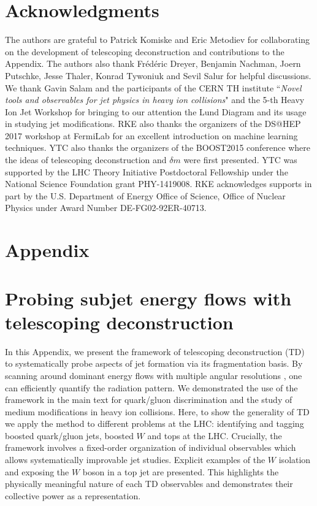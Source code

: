 \documentclass[notoc,preprintnumbers]{JHEP3}
\begin{document}
\section*{Acknowledgments}
The authors are grateful to Patrick Komiske and Eric Metodiev for collaborating on the development of telescoping deconstruction and contributions to the Appendix. The authors also thank Fr\'ed\'eric Dreyer, Benjamin Nachman, Joern Putschke, Jesse Thaler, Konrad Tywoniuk and Sevil Salur for helpful discussions. We thank Gavin Salam and the participants of the CERN TH institute ``{\sl Novel tools and observables for jet physics in heavy ion collisions}" and the 5-th Heavy Ion Jet Workshop for bringing to our attention the Lund Diagram and its usage in studying jet modifications. RKE also thanks the organizers of the DS@HEP 2017 workshop at FermiLab for an excellent introduction on machine learning techniques. YTC also thanks the organizers of the BOOST2015 conference where the ideas of telescoping deconstruction and $\delta m$ were first presented. YTC was supported by the LHC Theory Initiative Postdoctoral Fellowship under the National Science Foundation grant PHY-1419008. RKE acknowledges supports in part by the U.S. Department of Energy Office of Science, Office of Nuclear Physics under Award Number DE-FG02-92ER-40713.









\newpage
\appendix
\section*{Appendix}
\section{Probing subjet energy flows with telescoping deconstruction}

In this Appendix, we present the framework of telescoping deconstruction (TD) to systematically probe aspects of jet formation via its fragmentation basis. By scanning around dominant energy flows with multiple angular resolutions \cite{Chien:2013kca,Chien:2014hla}, one can efficiently quantify the radiation pattern. We demonstrated the use of the framework in the main text for quark/gluon discrimination and the study of medium modifications in heavy ion collisions. Here, to show the generality of TD we apply the method to different problems at the LHC: identifying and tagging boosted quark/gluon jets,  boosted $W$ and tops at the LHC. Crucially, the framework involves a fixed-order organization of individual observables which allows systematically improvable jet studies. Explicit examples of the $W$ isolation \cite{Chien:2017xrb} and exposing the $W$ boson in a top jet are presented. This highlights the physically meaningful nature of each TD observables and demonstrates their collective power as a representation.
\end{document}
